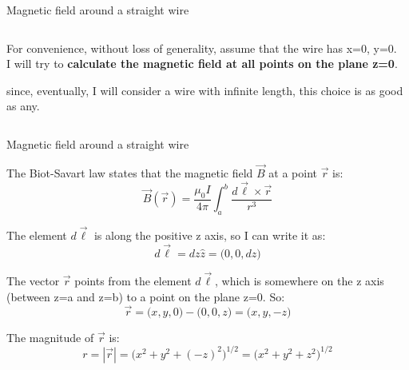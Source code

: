 \begin{frame}{Magnetic field around a straight wire}
\begin{columns}
\begin{column}{0.60\textwidth}
{\begin{itemize}
{\begin{itemize}
{        }
        \end{itemize}
   }
  \end{itemize}
  For convenience, without loss of generality,
  assume that the wire has x=0, y=0.\\
  \vspace{0.2cm}
  I will try to {\bf calculate the magnetic field at all points on the plane z=0}.
  \begin{itemize}
  {\small
      \item since, eventually, I will consider a wire with infinite length,
                this choice is as good as any.
  }
  \end{itemize}

  }
  \end{column}
\end{columns}

\end{frame}


%
%
%

\begin{frame}{Magnetic field around a straight wire}

The Biot-Savart law states that the magnetic field $\vec{B}$ at a point $\vec{r}$ is:
\begin{equation*}
  \vec{B}(\vec{r}) = \frac{\mu_0I}{4\pi} \int_{a}^{b} \frac{d\vec{\ell} \times \vec{r}}{r^3}
\end{equation*}

The element $d\vec{\ell}$ is along the positive z axis, so I can write it as:
\begin{equation*}
  d\vec{\ell} = dz \hat{z} = \Big( 0, 0, dz \Big)
\end{equation*}

The vector $\vec{r}$ points from the element $d\vec{\ell}$, which is somewhere on the z axis
(between z=a and z=b) to a point on the plane z=0. So:
\begin{equation*}
  \vec{r} = \Big( x, y, 0 \Big) - \Big( 0, 0, z \Big) = \Big( x, y, -z \Big)
\end{equation*}

The magnitude of $\vec{r}$ is:
\begin{equation*}
  r = |\vec{r}| = \Big( x^2 + y^2 + (-z)^2 \Big)^{1/2} = \Big( x^2 + y^2 + z^2 \Big)^{1/2}
\end{equation*}

\end{frame}

%
%
%

